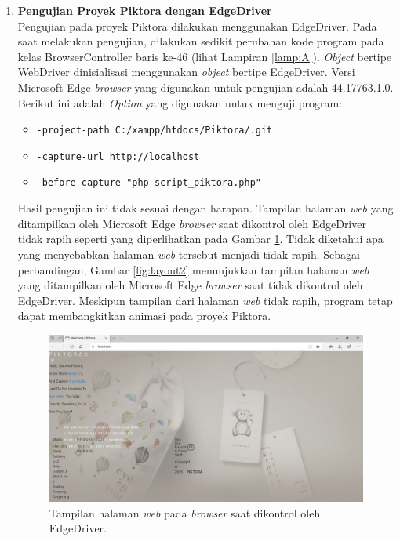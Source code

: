 \begin{enumerate}
\item \textbf{Pengujian Proyek Piktora dengan EdgeDriver}\\
Pengujian pada proyek Piktora dilakukan menggunakan EdgeDriver. Pada saat melakukan pengujian, dilakukan sedikit perubahan kode program pada kelas BrowserController baris ke-46 (lihat Lampiran \ref{lamp:A}). \textit{Object} bertipe WebDriver dinisialisasi menggunakan \textit{object} bertipe EdgeDriver. Versi Microsoft Edge \textit{browser} yang digunakan untuk pengujian adalah 44.17763.1.0. Berikut ini adalah \textit{Option} yang digunakan untuk menguji program:
\begin{itemize}
\item \texttt{-project-path C:/xampp/htdocs/Piktora/.git}
\item \texttt{-capture-url http://localhost}
\item \texttt{-before-capture "php script\_piktora.php"}
\end{itemize}
Hasil pengujian ini tidak sesuai dengan harapan. Tampilan halaman \textit{web} yang ditampilkan oleh Microsoft Edge \textit{browser} saat dikontrol oleh EdgeDriver tidak rapih seperti yang diperlihatkan pada Gambar \ref{fig:layout1}. Tidak diketahui apa yang menyebabkan halaman \textit{web} tersebut menjadi tidak rapih. Sebagai perbandingan, Gambar \ref{fig:layout2} menunjukkan tampilan halaman \textit{web} yang ditampilkan oleh Microsoft Edge \textit{browser} saat tidak dikontrol oleh EdgeDriver. Meskipun tampilan dari halaman \textit{web} tidak rapih, program tetap dapat membangkitkan animasi pada proyek Piktora.    

\begin{figure}[H]
	\centering
		\includegraphics[scale=0.4]{Gambar/Layout_dengan_Edge_Driver.png}
	\caption{Tampilan halaman \textit{web} pada \textit{browser} saat dikontrol oleh EdgeDriver.}
	\label{fig:layout1}
\end{figure}


\end{enumerate}
